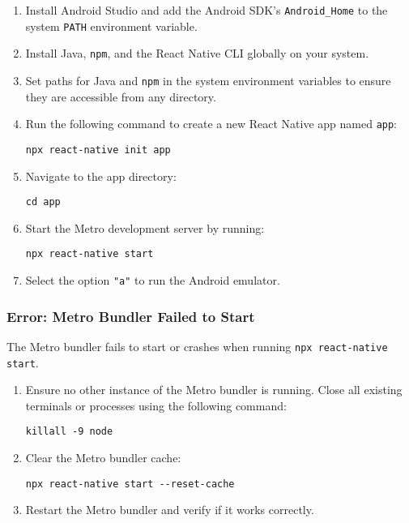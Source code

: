 \documentclass{article}
\begin{document}
\begin{enumerate}
    \item Install Android Studio and add the Android SDK's \texttt{Android\_Home} to the system \texttt{PATH} environment variable.
    \item Install Java, \texttt{npm}, and the React Native CLI globally on your system.
    \item Set paths for Java and \texttt{npm} in the system environment variables to ensure they are accessible from any directory.
    \item Run the following command to create a new React Native app named \texttt{app}:
    \begin{lstlisting}
npx react-native init app
    \end{lstlisting}
    \item Navigate to the app directory:
    \begin{lstlisting}
cd app
    \end{lstlisting}
    \item Start the Metro development server by running:
    \begin{lstlisting}
npx react-native start
    \end{lstlisting}
    \item Select the option \texttt{"a"} to run the Android emulator.
\end{enumerate}

\subsubsection{Error: Metro Bundler Failed to Start}

The Metro bundler fails to start or crashes when running \texttt{npx react-native start}.

\begin{enumerate}
    \item Ensure no other instance of the Metro bundler is running. Close all existing terminals or processes using the following command:
    \begin{lstlisting}
killall -9 node
    \end{lstlisting}
    \item Clear the Metro bundler cache:
    \begin{lstlisting}
npx react-native start --reset-cache
    \end{lstlisting}
    \item Restart the Metro bundler and verify if it works correctly.
\end{enumerate}
\end{document}

